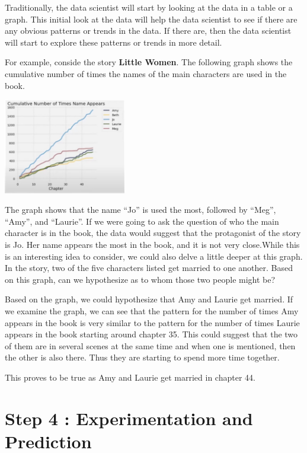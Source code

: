 \documentclass[
  letterpaper,
  DIV=11,
  numbers=noendperiod]{scrreprt}
\begin{document}
Traditionally, the data scientist will start by looking at the data in a
table or a graph. This initial look at the data will help the data
scientist to see if there are any obvious patterns or trends in the
data. If there are, then the data scientist will start to explore these
patterns or trends in more detail.

For example, conside the story \textbf{Little Women}. The following
graph shows the cumulative number of times the names of the main
characters are used in the book.

\includegraphics[width=0.4\textwidth,height=\textheight]{./images/WIDS-6.jpg}

The graph shows that the name ``Jo'' is used the most, followed by
``Meg'', ``Amy'', and ``Laurie''. If we were going to ask the question
of who the main character is in the book, the data would suggest that
the protagonist of the story is Jo. Her name appears the most in the
book, and it is not very close.While this is an interesting idea to
consider, we could also delve a little deeper at this graph. In the
story, two of the five characters listed get married to one another.
Based on this graph, can we hypothesize as to whom those two people
might be?

Based on the graph, we could hypothesize that Amy and Laurie get
married. If we examine the graph, we can see that the pattern for the
number of times Amy appears in the book is very similar to the pattern
for the number of times Laurie appears in the book starting around
chapter 35. This could suggest that the two of them are in several
scenes at the same time and when one is mentioned, then the other is
also there. Thus they are starting to spend more time together.

This proves to be true as Amy and Laurie get married in chapter 44.

\section*{Step 4 : Experimentation and
Prediction}\label{step-4-experimentation-and-prediction}
\end{document}
